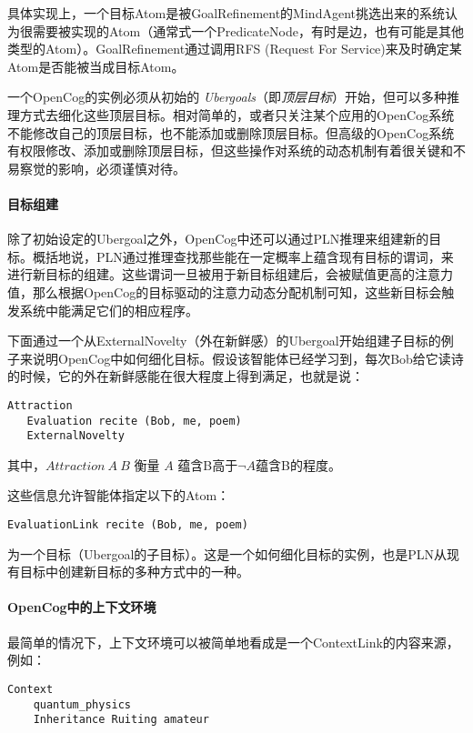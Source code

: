 具体实现上，一个目标Atom是被GoalRefinement的MindAgent挑选出来的系统认为很需要被实现的Atom（通常式一个PredicateNode，有时是边，也有可能是其他类型的Atom）。GoalRefinement通过调用RFS (Request For Service)来及时确定某Atom是否能被当成目标Atom。

一个OpenCog的实例必须从初始的 \textit{Ubergoals}（即\textit{顶层目标}）开始，但可以多种推理方式去细化这些顶层目标。相对简单的，或者只关注某个应用的OpenCog系统不能修改自己的顶层目标，也不能添加或删除顶层目标。但高级的OpenCog系统有权限修改、添加或删除顶层目标，但这些操作对系统的动态机制有着很关键和不易察觉的影响，必须谨慎对待。

\paragraph{目标组建}\label{Goal Formation}

除了初始设定的Ubergoal之外，OpenCog中还可以通过PLN推理来组建新的目标。概括地说，PLN通过推理查找那些能在一定概率上蕴含现有目标的谓词，来进行新目标的组建。这些谓词一旦被用于新目标组建后，会被赋值更高的注意力值，那么根据OpenCog的目标驱动的注意力动态分配机制可知，这些新目标会触发系统中能满足它们的相应程序。

下面通过一个从ExternalNovelty（外在新鲜感）的Ubergoal开始组建子目标的例子来说明OpenCog中如何细化目标。假设该智能体已经学习到，每次Bob给它读诗的时候，它的外在新鲜感能在很大程度上得到满足，也就是说：

\begin{verbatim}
Attraction
   Evaluation recite (Bob, me, poem)
   ExternalNovelty
\end{verbatim}
\noindent 其中，$\textit{Attraction}\ A\ B$ 衡量 $A$ 蕴含B高于$\lnot A$蕴含B的程度。

这些信息允许智能体指定以下的Atom：

\begin{verbatim}
EvaluationLink recite (Bob, me, poem)
\end{verbatim}

\noindent 为一个目标（Ubergoal的子目标）。这是一个如何细化目标的实例，也是PLN从现有目标中创建新目标的多种方式中的一种。

\paragraph{OpenCog中的上下文环境}\label{Context Atoms}

最简单的情况下，上下文环境可以被简单地看成是一个ContextLink的内容来源，例如：

\begin{verbatim}
Context
    quantum_physics
    Inheritance Ruiting amateur
\end{verbatim}

